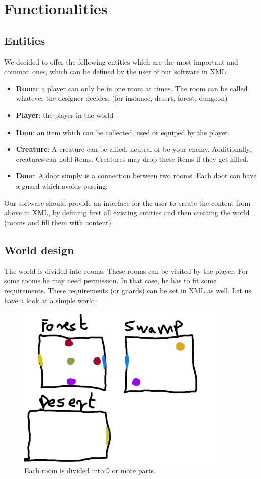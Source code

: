 \chapter{Functionalities}
\section{Entities}
We decided to offer the following entities which are the most important and common ones, which can be defined by the user of our software in XML:

\begin{itemize}
	\item{\textbf{Room}: a player can only be in one room at times. The room can be called whatever the designer decides. (for instance, desert, forest, dungeon)}
	\item{\textbf{Player}: the player in the world}
	\item{\textbf{Item}: an item which can be collected, used or equiped by the player.}
	\item{\textbf{Creature}: A creature can be allied, neutral or be your enemy. Additionally, creatures can hold items. Creatures may drop these items if they get killed.}
	\item{\textbf{Door}: A door simply is a connection between two rooms. Each door can have a guard which avoids passing.}
\end{itemize}

Our software should provide an interface for the user to create the content from above in XML, by defining first all existing entities and then creating the world (rooms and fill them with content).

\section{World design}

The world is divided into rooms. These rooms can be visited by the player. For some rooms he may need permission. In that case, he has to fit some requirements. These requirements (or guards) can be set in XML as well. Let us have a look at a simple world:

\begin{figure}[t]
  \centering
  \includegraphics[width=4in]{../demo/demo.jpg}
  \caption{Each room is divided into 9 or more parts.}
\end{figure}

